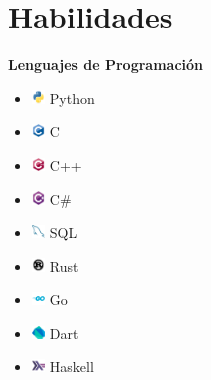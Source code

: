 \documentclass{article}
\begin{document}
\section*{Habilidades}
\begin{multicols}{3}
\raggedcolumns
\textbf{Lenguajes de Programación}
\begin{itemize}
    \item \includegraphics[height=10pt]{images/icons/python.png}
    Python
    \item \includegraphics[height=10pt]{images/icons/c.png}
    C
    \item \includegraphics[height=10pt]{images/icons/cpp.png}
    C++
    \item \includegraphics[height=10pt]{images/icons/csharp.png}
    C\#
    \item \includegraphics[height=10pt]{images/icons/mysql-original.png}
    SQL
    \item \includegraphics[height=10pt]{images/icons/rust-plain.png}
    Rust
    \item \includegraphics[height=10pt]{images/icons/go-original-wordmark.png}
    Go
    \item \includegraphics[height=10pt]{images/icons/dart.png}
    Dart
    \item \includegraphics[height=10pt]{images/icons/haskell-original.png}
    Haskell

\end{itemize}
\end{multicols}
\end{document}

